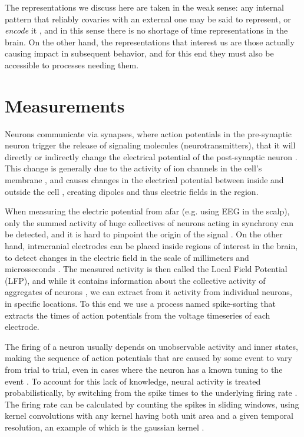     The representations we discuss here are taken in the weak sense: any internal pattern that reliably covaries with an external one may be said to represent, or \textit{encode} it \cite{rosch1991embodied}, and in this sense there is no shortage of time representations in the brain. On the other hand, the representations that interest us are those actually causing impact in subsequent behavior, and for this end they must also be accessible to processes needing them.
    
\section{Measurements}
    Neurons communicate via synapses, where action potentials in the pre-synaptic neuron trigger the release of signaling molecules (neurotransmitters), that it will directly or indirectly change the electrical potential of the post-synaptic neuron \cite{purves2014neuroscience}. This change is generally due to the activity of ion channels in the cell's membrane \cite{purves2014neuroscience}, and causes changes in the electrical potential between inside and outside the cell \cite{purves2014neuroscience}, creating dipoles and thus electric fields in the region.
    
    
    When measuring the electric potential from afar (e.g. using EEG in the scalp), only the summed activity of huge collectives of neurons acting in synchrony can be detected, and it is hard to pinpoint the origin of the signal \cite{buzsaki2012origin}. On the other hand, intracranial electrodes can be placed inside regions of interest in the brain, to detect changes in the electric field in the scale of millimeters and microsseconds \cite{}. The measured activity is then called the Local Field Potential (LFP), and while it contains information about the collective activity of aggregates of neurons \cite{buzsaki2012origin}, we can extract from it activity from individual neurons, in specific locations. To this end we use a process named spike-sorting \cite{rey2015past} that extracts the times of action potentials from the voltage timeseries of each electrode. 
    
    The firing of a neuron usually depends on unobservable activity and inner states, making the sequence of action potentials that are caused by some event to vary from trial to trial, even in cases where the neuron has a known tuning to the event \cite[p~7-8]{dayan2001theoretical}. To account for this lack of knowledge, neural activity is treated probabilistically, by switching from the spike times to the underlying firing rate \cite[p~9-11]{dayan2001theoretical}. The firing rate can be calculated by counting the spikes in sliding windows, using kernel convolutions with any kernel having both unit area and a given temporal resolution, an example of which is the gaussian kernel \cite[p~9-11]{dayan2001theoretical}.
